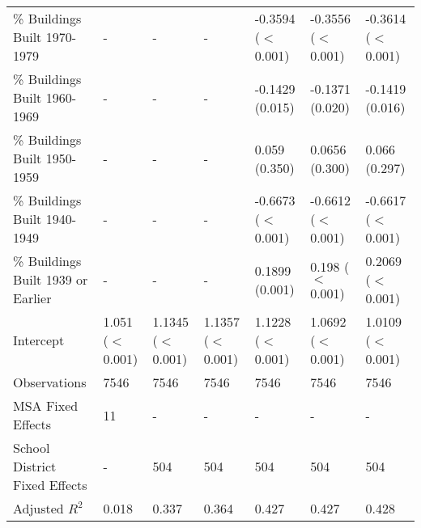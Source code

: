 \begin{landscape}
\begin{table}[h]
\begin{tabular}{l|llllll}
\% Buildings Built 1970-1979 &- & - & - & -0.3594 ($<$0.001) & -0.3556 ($<$0.001) & -0.3614 ($<$0.001) \\
\% Buildings Built 1960-1969 &- & - & - & -0.1429 (0.015) & -0.1371 (0.020) & -0.1419 (0.016) \\
\% Buildings Built 1950-1959 &- & - & - & 0.059 (0.350) & 0.0656 (0.300) & 0.066 (0.297) \\
\% Buildings Built 1940-1949 &- & - & - & -0.6673 ($<$0.001) & -0.6612 ($<$0.001) & -0.6617 ($<$0.001) \\
\% Buildings Built 1939 or Earlier &- & - & - & 0.1899 (0.001) & 0.198 ($<$0.001) & 0.2069 ($<$0.001) \\
Intercept &1.051 ($<$0.001) & 1.1345 ($<$0.001) & 1.1357 ($<$0.001) & 1.1228 ($<$0.001) & 1.0692 ($<$0.001) & 1.0109 ($<$0.001) \\
Observations &7546 & 7546 & 7546 & 7546 & 7546 & 7546 \\
MSA Fixed Effects &11 & - & - & - & - & - \\
School District Fixed Effects &- & 504 & 504 & 504 & 504 & 504 \\
Adjusted $R^2$ &0.018 & 0.337 & 0.364 & 0.427 & 0.427 & 0.428 \\\hline
\end{tabular}
\end{table}
\newpage
\end{landscape}
\restoregeometry

